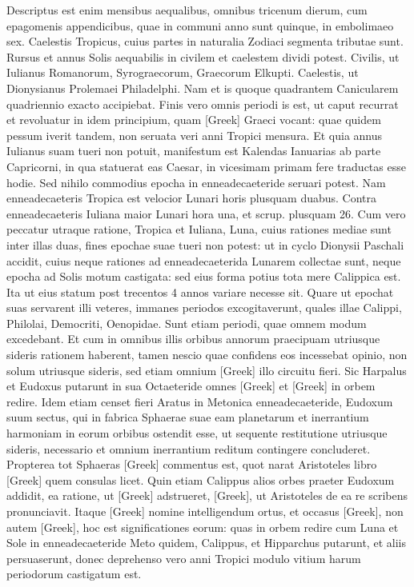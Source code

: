 Descriptus est enim mensibus aequalibus,
omnibus tricenum dierum, cum epagomenis appendicibus, quae
in communi anno sunt quinque, in embolimaeo sex.
Caelestis Tropicus,
cuius partes in naturalia Zodiaci segmenta tributae sunt.
Rursus
et annus Solis aequabilis in civilem et caelestem dividi potest.
Civilis,
ut Iulianus Romanorum, Syrograecorum, Graecorum Elkupti.
Caelestis,
ut Dionysianus Prolemaei Philadelphi.
Nam et is quoque quadrantem
Canicularem quadriennio exacto accipiebat.
Finis vero
omnis periodi is est, ut caput recurrat et revoluatur in idem principium,
quam \textgreek{[Greek]} Graeci vocant: quae quidem pessum iverit tandem,
non seruata veri anni Tropici mensura.
Et quia annus Iulianus
suam tueri non potuit, manifestum est Kalendas Ianuarias ab 
parte Capricorni, in qua statuerat eas Caesar, in vicesimam primam
fere traductas esse hodie.
Sed nihilo commodius epocha in enneadecaeteride
seruari potest.
Nam enneadecaeteris Tropica est velocior
Lunari horis plusquam duabus.
Contra enneadecaeteris Iuliana
maior Lunari hora una, et scrup. plusquam 26.
Cum vero peccatur
utraque ratione, Tropica et Iuliana, Luna, cuius rationes mediae sunt
inter illas duas, fines epochae suae tueri non potest: ut in cyclo Dionysii
Paschali accidit, cuius neque rationes ad enneadecaeterida Lunarem
collectae sunt, neque epocha ad Solis motum castigata: sed eius
forma potius tota mere Calippica est.
Ita ut eius statum post trecentos
4 annos variare necesse sit.
Quare ut epochat suas servarent illi veteres,
immanes periodos excogitaverunt, quales illae Calippi, Philolai, Democriti,
Oenopidae.
Sunt etiam periodi, quae omnem modum excedebant.
Et cum in omnibus illis orbibus annorum praecipuam
utriusque sideris rationem haberent, tamen nescio quae confidens eos
incessebat opinio, non solum utriusque sideris, sed etiam omnium
\textgreek{[Greek]} illo circuitu fieri.
Sic Harpalus et Eudoxus putarunt
in sua Octaeteride omnes \textgreek{[Greek]}
 et \textgreek{[Greek]} in orbem redire.
Idem etiam censet fieri Aratus in Metonica enneadecaeteride, Eudoxum
suum sectus, qui in fabrica Sphaerae suae eam planetarum et inerrantium
harmoniam in eorum orbibus ostendit esse, ut sequente
restitutione utriusque sideris, necessario et omnium inerrantium reditum
contingere concluderet.
Propterea tot Sphaeras \textgreek{[Greek]} commentus
est, quot narat Aristoteles libro  \textgreek{[Greek]} quem
consulas licet.
Quin etiam Calippus alios orbes praeter Eudoxum
addidit, ea ratione, ut \textgreek{[Greek]} adstrueret,
 \textgreek{[Greek]},
ut Aristoteles de ea re scribens pronunciavit.
Itaque \textgreek{[Greek]} nomine intelligendum ortus,
 et occasus \textgreek{[Greek]},
non autem \textgreek{[Greek]}, hoc est significationes
eorum: quas in orbem redire cum Luna et Sole in enneadecaeteride
Meto quidem, Calippus, et Hipparchus putarunt, et aliis
persuaserunt, donec deprehenso vero anni Tropici modulo vitium
harum periodorum castigatum est.

